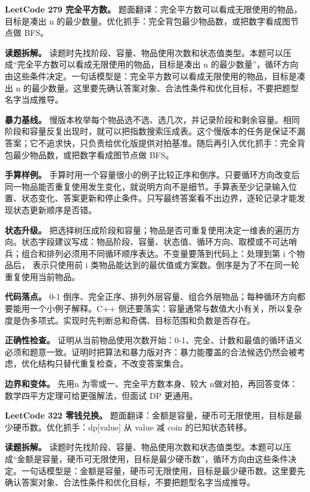\noindent\textbf{LeetCode 279 完全平方数。} 题面翻译：完全平方数可以看成无限使用的物品，目标是凑出 n 的最少数量。优化抓手：完全背包最少物品数，或把数字看成图节点做 BFS。

\textbf{读题拆解。} 读题时先找阶段、容量、物品使用次数和状态值类型。本题可以压成“完全平方数可以看成无限使用的物品，目标是凑出 n 的最少数量”，循环方向由这些条件决定。一句话模型是：完全平方数可以看成无限使用的物品，目标是凑出 n 的最少数量。这里要先确认答案对象、合法性条件和优化目标，不要把题型名字当成推导。

\textbf{暴力基线。} 慢版本枚举每个物品选不选、选几次，并记录阶段和剩余容量。相同阶段和容量反复出现时，就可以把指数搜索压成表。这个慢版本的任务是保证不漏答案；它不追求快，只负责给优化版提供对拍基准。随后再引入优化抓手：完全背包最少物品数，或把数字看成图节点做 BFS。

\textbf{手算样例。} 手算时用一个容量很小的例子比较正序和倒序。只要循环方向改变后同一物品能否重复使用发生变化，就说明方向不是细节。手算表至少记录输入位置、状态变化、答案更新和停止条件。只写最终答案看不出边界，逐轮记录才能发现状态更新顺序是否错。

\textbf{状态升级。} 把选择树压成阶段和容量；物品是否可重复使用决定一维表的遍历方向。状态字段建议写成：物品阶段、容量、状态值、循环方向、取模或不可达哨兵；组合和排列必须用不同循环顺序表达。不变量要落到代码上：处理到第 i 个物品后， 表示只使用前 i 类物品能达到的最优值或方案数。倒序是为了不在同一轮重复使用当前物品。

\textbf{代码落点。} 0-1 倒序、完全正序、排列外层容量、组合外层物品；每种循环方向都要能用一个小例子解释。C++ 侧还要落实：容量通常与数值大小有关，所以复杂度是伪多项式。实现时先判断总和奇偶、目标范围和负数是否存在。

\textbf{正确性检查。} 证明从当前物品使用次数开始：0-1、完全、计数和最值的循环语义必须和题意一致。证明时把算法和暴力版对齐：暴力能覆盖的合法候选仍然会被考虑，优化结构只替代重复检查，不改变答案集合。

\textbf{边界和变体。} 先用n 为零或一、完全平方数本身、较大 n做对拍，再回答变体：数学四平方定理可给更强解法，但面试 DP 更通用。

\noindent\textbf{LeetCode 322 零钱兑换。} 题面翻译：金额是容量，硬币可无限使用，目标是最少硬币数。优化抓手：dp[value] 从 value 减 coin 的已知状态转移。

\textbf{读题拆解。} 读题时先找阶段、容量、物品使用次数和状态值类型。本题可以压成“金额是容量，硬币可无限使用，目标是最少硬币数”，循环方向由这些条件决定。一句话模型是：金额是容量，硬币可无限使用，目标是最少硬币数。这里要先确认答案对象、合法性条件和优化目标，不要把题型名字当成推导。

